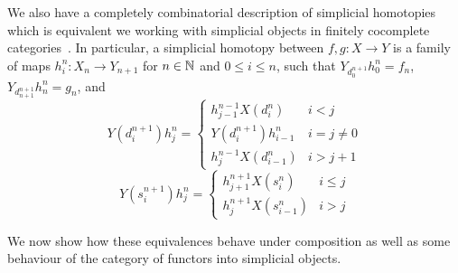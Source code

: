 We also have a completely combinatorial description of simplicial homotopies which is equivalent we working with simplicial objects in finitely cocomplete categories~\cite{weibel_1994}. In particular, a simplicial homotopy between $f,g:X\to Y$ is a family of maps $h_i^n:X_n\to Y_{n+1}$ for $n \in \mathbb N$ and $0\leq i \leq n$, such that $Y_{d_0^{n+1}}h^n_0 = f_n$, $Y_{d_{n+1}^{n+1}}h_n^n=g_n$, and 
\begin{equation*}
    Y(d_i^{n+1})h_j^n = \left\{\begin{array}{cc} h_{j-1}^{n-1}X(d_i^n) & i < j \\ Y(d_i^{n+1})h_{i-1}^n & i = j \neq 0 \\ h_j^{n-1}X(d_{i-1}^n) & i > j+1 \end{array}\right.
\end{equation*}
\begin{equation*}
    Y(s_i^{n+1})h_j^n = \left\{\begin{array}{cc} h_{j+1}^{n+1}X(s_i^n) & i \leq j \\ h_j^{n+1}X(s_{i-1}^n) & i > j \end{array}\right.
\end{equation*}

We now show how these equivalences behave under composition as well as some behaviour of the category of functors into simplicial objects.

